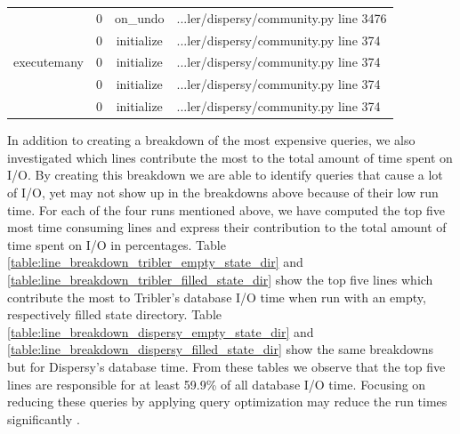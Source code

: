 \begin{table}[!h]
{\begin{tabular}{|c|c|c|l|}
		\multicolumn{1}{|c|}{\multirow{5}{*}{executemany}} & \multicolumn{1}{c|}{0} & \multicolumn{1}{c|}{on\_undo} & \multicolumn{1}{l|}{...ler/dispersy/community.py line 3476} \\ \cline{2-4}
		\multicolumn{1}{|c|}{} & \multicolumn{1}{c|}{0}  & \multicolumn{1}{c|}{initialize}  & \multicolumn{1}{l|}{...ler/dispersy/community.py line 374}  \\ \cline{2-4} 
		\multicolumn{1}{|c|}{} & \multicolumn{1}{c|}{0}  & \multicolumn{1}{c|}{initialize}  & \multicolumn{1}{l|}{...ler/dispersy/community.py line 374}  \\ \cline{2-4} 
		\multicolumn{1}{|c|}{} & \multicolumn{1}{c|}{0}  & \multicolumn{1}{c|}{initialize}  & \multicolumn{1}{l|}{...ler/dispersy/community.py line 374}  \\ \cline{2-4} 
		\multicolumn{1}{|c|}{} & \multicolumn{1}{c|}{0}  & \multicolumn{1}{c|}{initialize}  & \multicolumn{1}{l|}{...ler/dispersy/community.py line 374}  \\ \hline 
	\end{tabular}}
\end{table}

In addition to creating a breakdown of the most expensive queries, we also investigated which lines contribute the most to the total amount of time spent on I/O.
By creating this breakdown we are able to identify queries that cause a lot of I/O, yet may not show up in the breakdowns above because of their low run time.
For each of the four runs mentioned above, we have computed the top five most time consuming lines and express their contribution to the total amount of time spent on I/O in percentages.
Table \ref{table:line_breakdown_tribler_empty_state_dir} and \ref{table:line_breakdown_tribler_filled_state_dir} show the top five lines which contribute the most to Tribler's database I/O time when run with an empty, respectively filled state directory.
Table \ref{table:line_breakdown_dispersy_empty_state_dir} and \ref{table:line_breakdown_dispersy_filled_state_dir} show the same breakdowns but for Dispersy's database time.
From these tables we observe that the top five lines are responsible for at least 59.9\% of all database I/O time.
Focusing on reducing these queries by applying query optimization may reduce the run times significantly \cite{jarke1984query}.

